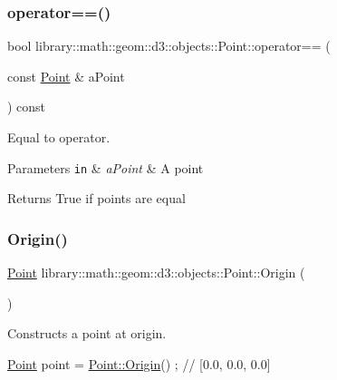 \subsubsection{\texorpdfstring{operator==()}{operator==()}}
{\footnotesize\ttfamily bool library\+::math\+::geom\+::d3\+::objects\+::\+Point\+::operator== (\begin{DoxyParamCaption}\item[{const \hyperlink{classlibrary_1_1math_1_1geom_1_1d3_1_1objects_1_1_point}{Point} \&}]{a\+Point }\end{DoxyParamCaption}) const}



Equal to operator. 


\begin{DoxyParams}[1]{Parameters}
\mbox{\tt in}  & {\em a\+Point} & A point \\
\hline
\end{DoxyParams}
\begin{DoxyReturn}{Returns}
True if points are equal 
\end{DoxyReturn}
\mbox{\label{classlibrary_1_1math_1_1geom_1_1d3_1_1objects_1_1_point_ab2a38e285c562e50bf350272c083986f}} 
\subsubsection{\texorpdfstring{Origin()}{Origin()}}
{\footnotesize\ttfamily \hyperlink{classlibrary_1_1math_1_1geom_1_1d3_1_1objects_1_1_point}{Point} library\+::math\+::geom\+::d3\+::objects\+::\+Point\+::\+Origin (\begin{DoxyParamCaption}{ }\end{DoxyParamCaption})\hspace{0.3cm}{\ttfamily [static]}}



Constructs a point at origin. 


\begin{DoxyCode}
\hyperlink{classlibrary_1_1math_1_1geom_1_1d3_1_1objects_1_1_point_a617e690ab6091af3de729cee337e309e}{Point} point = \hyperlink{classlibrary_1_1math_1_1geom_1_1d3_1_1objects_1_1_point_ab2a38e285c562e50bf350272c083986f}{Point::Origin}() ; \textcolor{comment}{// [0.0, 0.0, 0.0]}
\end{DoxyCode}


